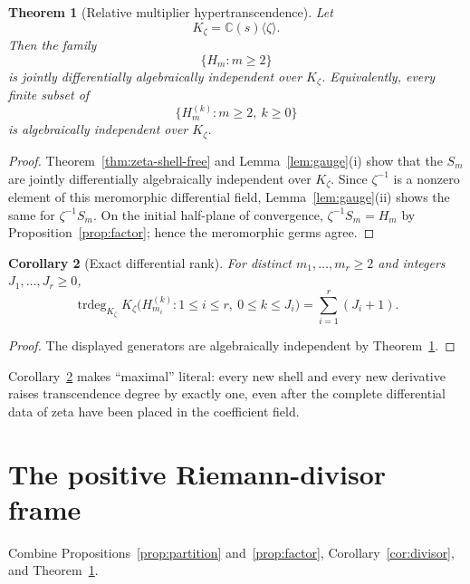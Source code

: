 \documentclass[11pt]{article}
\newtheorem{theorem}{Theorem}[section]
\newtheorem{corollary}[theorem]{Corollary}
\theoremstyle{definition}
\theoremstyle{remark}
\newcommand{\C}{\mathbb C}
\newcommand{\trdeg}{\operatorname{trdeg}}
\begin{document}
\begin{theorem}[Relative multiplier hypertranscendence]\label{thm:relative}
Let
\[
 K_\zeta=\C(s)\langle\zeta\rangle.
\]
Then the family
\[
 \{H_m:m\geq2\}
\]
is jointly differentially algebraically independent over \(K_\zeta\).  Equivalently, every
finite subset of
\[
 \{H_m^{(k)}:m\geq2,\ k\geq0\}
 \tag{5.2}
\]
is algebraically independent over \(K_\zeta\).
\end{theorem}

\begin{proof}
Theorem~\ref{thm:zeta-shell-free} and Lemma~\ref{lem:gauge}(i) show that the \(S_m\) are jointly
differentially algebraically independent over \(K_\zeta\).  Since \(\zeta^{-1}\) is a nonzero
element of this meromorphic differential field, Lemma~\ref{lem:gauge}(ii) shows the same for
\(\zeta^{-1}S_m\).  On the initial half-plane of convergence,
\(\zeta^{-1}S_m=H_m\) by Proposition~\ref{prop:factor}; hence the meromorphic germs agree.
\end{proof}

\begin{corollary}[Exact differential rank]\label{cor:rank}
For distinct \(m_1,\ldots,m_r\geq2\) and integers \(J_1,\ldots,J_r\geq0\),
\[
 \trdeg_{K_\zeta}
 K_\zeta\bigl(H_{m_i}^{(k)}:
 1\leq i\leq r,\ 0\leq k\leq J_i\bigr)
 =\sum_{i=1}^r(J_i+1).
 \tag{5.3}
\]
\end{corollary}

\begin{proof}
The displayed generators are algebraically independent by Theorem~\ref{thm:relative}.
\end{proof}

Corollary~\ref{cor:rank} makes ``maximal'' literal: every new shell and every new derivative
raises transcendence degree by exactly one, even after the complete differential data of zeta
have been placed in the coefficient field.

\section{The positive Riemann-divisor frame}\label{sec:rhframe}

Combine Propositions~\ref{prop:partition} and~\ref{prop:factor},
Corollary~\ref{cor:divisor}, and Theorem~\ref{thm:relative}.
\end{document}
